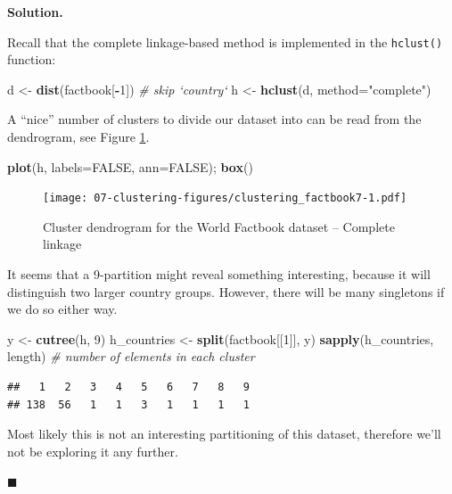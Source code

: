 \documentclass[10pt,b5paper,krantz1]{krantz}
\newenvironment{Shaded}{\begin{snugshade}}{\end{snugshade}}
\newcommand{\CommentTok}[1]{\textcolor[rgb]{0.37,0.37,0.37}{\textit{#1}}}
\newcommand{\DataTypeTok}[1]{\textcolor[rgb]{0.27,0.27,0.27}{#1}}
\newcommand{\DecValTok}[1]{\textcolor[rgb]{0.06,0.06,0.06}{#1}}
\newcommand{\KeywordTok}[1]{\textcolor[rgb]{0.27,0.27,0.27}{\textbf{#1}}}
\newcommand{\NormalTok}[1]{#1}
\newcommand{\OperatorTok}[1]{\textcolor[rgb]{0.43,0.43,0.43}{\textbf{#1}}}
\newcommand{\OtherTok}[1]{\textcolor[rgb]{0.37,0.37,0.37}{#1}}
\newcommand{\StringTok}[1]{\textcolor[rgb]{0.5,0.5,0.5}{#1}}
\newenvironment{solution}{%
\bigskip\noindent\textbf{Solution. }%
\it\ignorespaces%
\ignorespaces%
}{\ignorespaces%
\hfill$\blacksquare$%
}
\begin{document}
\begin{solution}

Recall that the complete linkage-based method is implemented in the
\texttt{hclust()} function:

\begin{Shaded}
\begin{Highlighting}[]
\NormalTok{d <-}\StringTok{ }\KeywordTok{dist}\NormalTok{(factbook[}\OperatorTok{-}\DecValTok{1}\NormalTok{]) }\CommentTok{# skip `country`}
\NormalTok{h <-}\StringTok{ }\KeywordTok{hclust}\NormalTok{(d, }\DataTypeTok{method=}\StringTok{"complete"}\NormalTok{)}
\end{Highlighting}
\end{Shaded}

A ``nice'' number of clusters to divide our dataset into
can be read from the dendrogram, see Figure \ref{fig:clustering_factbook7}.

\begin{Shaded}
\begin{Highlighting}[]
\KeywordTok{plot}\NormalTok{(h, }\DataTypeTok{labels=}\OtherTok{FALSE}\NormalTok{, }\DataTypeTok{ann=}\OtherTok{FALSE}\NormalTok{); }\KeywordTok{box}\NormalTok{()}
\end{Highlighting}
\end{Shaded}

\begin{figure}
\hypertarget{fig:clustering_factbook7}{%
\centering
\texttt{[image: 07-clustering-figures/clustering\_factbook7-1.pdf]}
\caption{Cluster dendrogram for the World Factbook dataset -- Complete linkage}\label{fig:clustering_factbook7}
}
\end{figure}

It seems that a 9-partition might reveal something interesting,
because it will distinguish two larger country groups.
However, there will be many singletons if we do so either way.

\begin{Shaded}
\begin{Highlighting}[]
\NormalTok{y <-}\StringTok{ }\KeywordTok{cutree}\NormalTok{(h, }\DecValTok{9}\NormalTok{)}
\NormalTok{h_countries <-}\StringTok{ }\KeywordTok{split}\NormalTok{(factbook[[}\DecValTok{1}\NormalTok{]], y)}
\KeywordTok{sapply}\NormalTok{(h_countries, length) }\CommentTok{# number of elements in each cluster}
\end{Highlighting}
\end{Shaded}

\begin{verbatim}
##   1   2   3   4   5   6   7   8   9 
## 138  56   1   1   3   1   1   1   1
\end{verbatim}

Most likely this is not an interesting partitioning of this dataset,
therefore we'll not be exploring it any further.

\end{solution}
\end{document}
